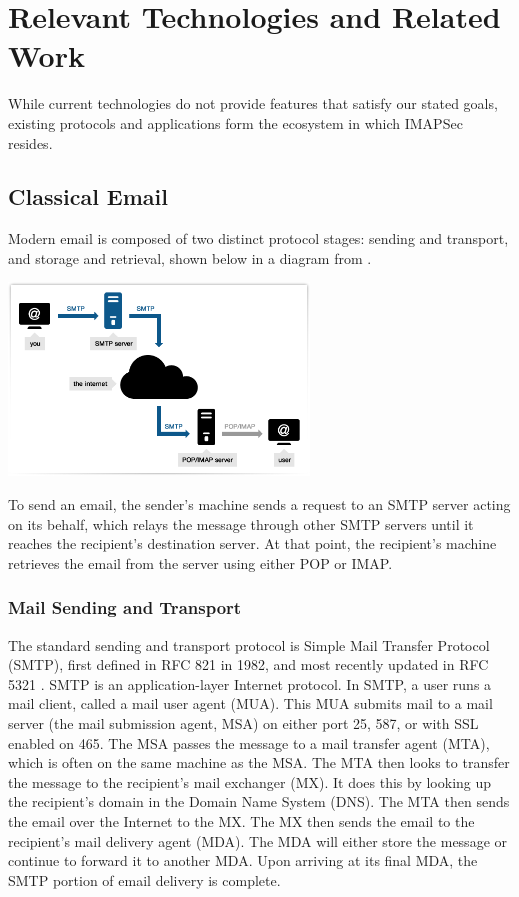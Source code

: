 \documentclass[pageno]{jpaper}
\newcommand{\project}{IMAPSec }
\begin{document}
\section{Relevant Technologies and Related Work}

While current technologies do not provide features that satisfy our stated goals, existing protocols and applications form the ecosystem in which \project resides.

\subsection{Classical Email}
Modern email is composed of two distinct protocol stages: sending and transport, and storage and retrieval, shown below in a diagram from \cite{smtp_imap}.

\begin{center}
\includegraphics[width=0.6\textwidth]{smtp_imap}
\end{center}

To send an email, the sender's machine sends a request to an SMTP server acting on its behalf, which relays the message through other SMTP servers until it reaches the recipient's destination server. At that point, the recipient's machine retrieves the email from the server using either POP or IMAP.

\subsubsection{Mail Sending and Transport}
The standard sending and transport protocol is Simple Mail Transfer Protocol (SMTP), first defined in RFC 821 \cite{postel1982rfc} in 1982, and most recently updated in RFC 5321 \cite{klensin2008rfc}. SMTP is an application-layer Internet protocol. In SMTP, a user runs a mail client, called a mail user agent (MUA). This MUA submits mail to a mail server (the mail submission agent, MSA) on either port 25, 587, or with SSL enabled on 465. The MSA passes the message to a mail transfer agent (MTA), which is often on the same machine as the MSA. The MTA then looks to transfer the message to the recipient's mail exchanger (MX). It does this by looking up the recipient's domain in the Domain Name System (DNS). The MTA then sends the email over the Internet to the MX. The MX then sends the email to the recipient's mail delivery agent (MDA). The MDA will either store the message or continue to forward it to another MDA. Upon arriving at its final MDA, the SMTP portion of email delivery is complete.
\end{document}
